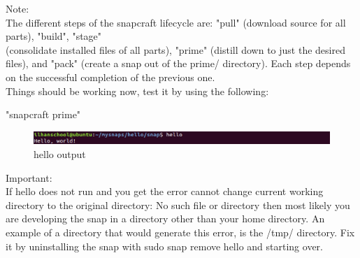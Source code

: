 \documentclass{article}
\begin{document}
\begin{flushleft}
\begin{flushleft}
Note:\label{ref:snaplife}\\ 
The different steps of the snapcraft lifecycle are: "pull" (download source for all parts), "build", "stage"\\
(consolidate installed files of all parts), "prime" (distill down to just the desired files), and
"pack" (create a snap out of the prime/ directory). Each step depends on the successful completion
of the previous one.\\
\bigskip
Things should be working now, test it by using the following:
			\begin{center}	
			"snapcraft prime"\\ 
			\end{center}

\label{fig:step18}	
	\begin{figure}[H]
	\includegraphics[width=5in]{step18.png}
	\caption[Optional caption]{hello output}
	\end{figure}
Important:\\
If hello does not run and you get the error cannot change current working directory to the
original directory: No such file or directory then most likely you are developing the snap in a
directory other than your home directory. An example of a directory that would generate this error,
is the /tmp/ directory. Fix it by uninstalling the snap with sudo snap remove hello and
starting over.					
\end{flushleft}
\cleardoublepage
%
%
%
%

\end{flushleft}
\end{document}
